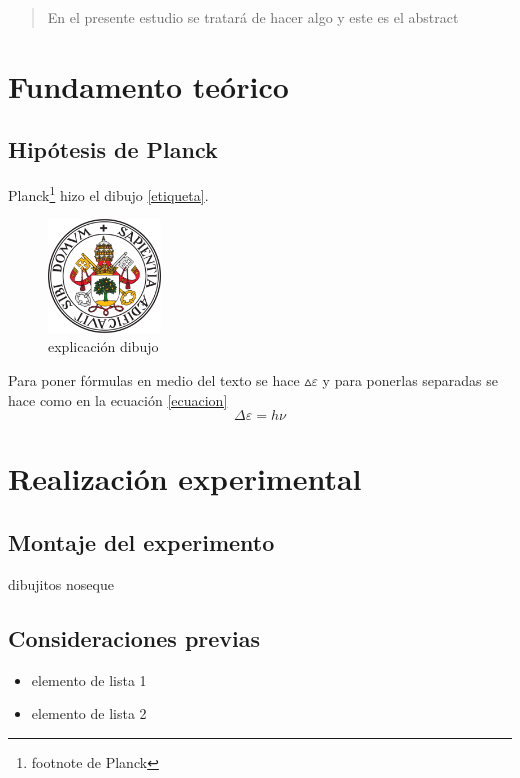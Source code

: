\documentclass[12pt,a4paper]{article}
\begin{document}
\renewcommand{\abstractname}{Abstract} %
\begin{abstract}
En el presente estudio se tratará de hacer algo y este es el abstract
\end{abstract}
\begin{multicols}{2} %

\section{Fundamento teórico}
\subsection{Hipótesis de Planck}
Planck\footnote{footnote de Planck} hizo el dibujo \eqref{etiqueta}.

\begin{figure}[H]
\centering
\includegraphics[width=3cm]{fotos/escudo}
\caption{explicación dibujo \cite{referencia}}
\label{etiqueta}
\end{figure}

Para poner fórmulas en medio del texto se hace ${\vartriangle}\varepsilon$ y para ponerlas separadas se hace como en la ecuación \eqref{ecuacion}
\begin{equation}
\Delta\varepsilon=h\nu
\label{ecuacion}
\end{equation} %


\section{Realización experimental}
\subsection{Montaje del experimento}
dibujitos noseque

\subsection{Consideraciones previas}
\label{consideraciones}
\begin{itemize}
\item elemento de lista 1
\item elemento de lista 2
\end{itemize}


\end{multicols}
\end{document}
